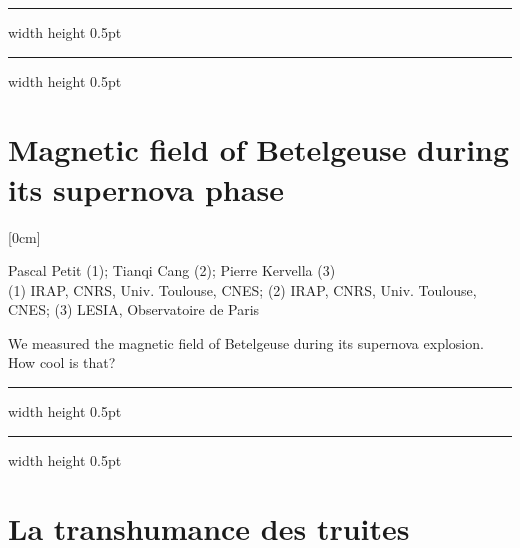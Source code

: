 \documentclass[a4paper,11pt]{book}
\def\doubleline{
\hrule width \hsize height 0.5pt  \kern 1mm \hrule width \hsize height 0.5pt 
}
\begin{document}
\noindent\doubleline
        
          \section[Magnetic field of Betelgeuse during its supernova phase \newline(Pascal Petit)] { Magnetic field of Betelgeuse during its supernova phase }



[0cm]



\begin{center}
    
{\large Pascal Petit (1)};{ \large  Tianqi Cang (2)};{ \large  Pierre Kervella (3)}\\
  
\vspace{2 mm}
\noindent (1) IRAP, CNRS, Univ. Toulouse, CNES; (2)  IRAP, CNRS, Univ. Toulouse, CNES; (3)  LESIA, Observatoire de Paris\\

\end{center}



  
\vspace{2 mm}
\noindent We measured the magnetic field of Betelgeuse during its supernova explosion. How cool is that?

\noindent\doubleline
        
          \section[La transhumance des truites \newline(Sébastien Deheuvels)] { La transhumance des truites }

\end{document}
